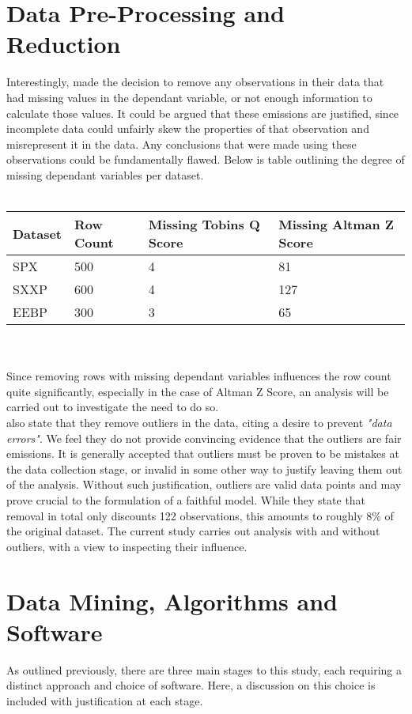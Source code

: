 \section{Data Pre-Processing and Reduction}
{Interestingly, \cite{moldovan2015learning} made the decision to remove any observations in their data that had missing values in the dependant variable, or not enough information to calculate those values. It could be argued that these emissions are justified, since incomplete data could unfairly skew the properties of that observation and misrepresent it in the data. Any conclusions that were made using these observations could be fundamentally flawed. Below is table outlining the degree of missing dependant variables per dataset. 
\\\\
\begin{tabular}{ |p{3cm}||p{3cm}|p{3cm}|p{3cm}|  }
 \hline
 Dataset & Row Count & Missing Tobins Q Score & Missing Altman Z Score\\
 \hline
 SPX & 500 & 4  & 81 \\
 SXXP &   600  & 4  & 127 \\
 EEBP & 300 & 3 &  65 \\
 \hline
\end{tabular}\\\\
Since removing rows with missing dependant variables influences the row count quite significantly, especially in the case of Altman Z Score, an analysis will be carried out to investigate the need to do so. \\

\cite{moldovan2015learning} also state that they remove outliers in the data, citing a desire to prevent {\it "data errors"}. We feel they do not provide convincing evidence that the outliers are fair emissions. It is generally accepted that outliers must be proven to be mistakes at the data collection stage, or invalid in some other way to justify leaving them out of the analysis. Without such justification, outliers are valid data points and may prove crucial to the formulation of a faithful model. While they state that removal in total only discounts 122 observations, this amounts to roughly 8\% of the original dataset. The current study carries out analysis with and without outliers, with a view to inspecting their influence. 
\section{Data Mining, Algorithms and Software}
{As outlined previously, there are three main stages to this study, each requiring a distinct approach and choice of software. Here, a discussion on this choice is included with justification at each stage.}
}
